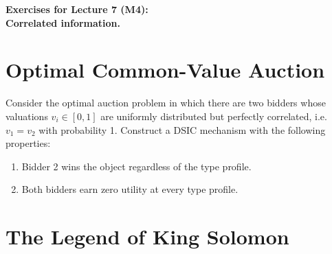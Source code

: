 \documentclass[a4paper]{article}
\newif\ifsolutions
\begin{document}
\begin{center}
		\LARGE\textbf{Exercises for Lecture 7 (M4):\\ Correlated information.}
\end{center}





\section{Optimal Common-Value Auction}
	Consider the optimal auction problem in which there are two bidders whose valuations $v_i \in [0,1]$ are uniformly distributed but 
	perfectly correlated, i.e. $v_1 = v_2$ with probability 1.  Construct a DSIC mechanism with the following properties:
	\begin{enumerate}
		\item Bidder 2 wins the object regardless of the type profile.
		\item Both bidders earn zero utility at every type profile.
	\end{enumerate}

\ifsolutions
\section*{Solution}
	Consider the following allocation:
	\[k_1(v_1,v_2)=0\]
	\[k_2(v_1,v_2)=\left\{\begin{array}{cc} 0 & \text{ if }\quad v_2\neq v_1\\
		1 & \quad\text{otherwise}\quad
		
	\end{array}
	\right.\]
	\[t_1(v_1,v_2)=0\]
	\[t_2(v_1,v_2)=\left\{\begin{array}{cc} 0 & \text{if}\quad v_2\neq v_1\\
		v_1 & \quad\text{otherwise}\quad\end{array}\right.\]
	Note that for bidder 1 it is weakly dominant to say her valuation: she never gets the good so she might as well say $v_1$. For player 2, we have exactly the same situation: given the message sent by agent 1, she is indifferent between saying the truth and not, so telling the truth is weakly dominant. Agent 2 gets the good always and both bidders have 0 utility at every type profile.
\fi 


\section{The Legend of King Solomon}
\end{document}
